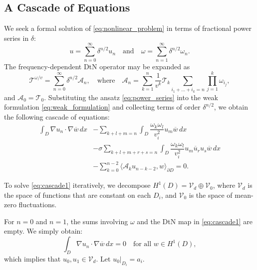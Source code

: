 \documentclass[a4paper,reqno,twoside]{amsart}
\numberwithin{equation}{section}
\theoremstyle{definition}
\newcommand{\<}{\ensuremath \leq}
\renewcommand{\>}{\ensuremath \geq}
\begin{document}
\subsection{A Cascade of Equations}\label{ssec:cascade}
We seek a formal solution of \eqref{eq:nonlinear_problem} in terms of fractional power series in $\delta$:
\begin{equation}\label{eq:power_series}
    u = \sum_{n=0}^\infty \delta^{n/2} u_n \quad \text{and} \quad \omega = \sum_{n=1}^\infty \delta^{n/2} \omega_n.
\end{equation}
The frequency-dependent DtN operator may be expanded as
\begin{equation}
    \mathcal{T}^{\omega/v} = \sum_{n=0}^\infty \delta^{n/2} \mathcal{A}_n, \quad \text{where} \quad \mathcal{A}_n = \sum_{k=1}^n \frac{1}{v^k}\mathcal{T}_k \sum _{i_1 + \dots+i_k=n}\prod_{j=1}^k\omega_{i_j},
\end{equation}
and $\mathcal{A}_0 = \mathcal{T}_0$. Substituting the ansatz \eqref{eq:power_series} into the weak formulation \eqref{eq:weak_formulation} and collecting terms of order $\delta^{n/2}$, we obtain the following cascade of equations:
\begin{equation}\label{eq:cascade1}
    \begin{aligned}
        \int_{D} \nabla u_n \cdot \nabla \overline{w} \, dx 
        &- \sum_{k+l+m=n}\int_D \dfrac{\omega_k\omega_l}{v_i^2} u_m \overline{w} \, dx \\
        &- \sigma \sum_{k+l+m+r+s=n}\int_D \dfrac{\omega_k\omega_l}{v_i^2}u_m\overline{u}_r u_s\overline{w} \, dx \\
        &- \sum_{k=0}^{n-2}\langle\mathcal{A}_k u_{n-k-2},w\rangle_{\partial D} = 0.
    \end{aligned}
\end{equation}

To solve \eqref{eq:cascade1} iteratively, we decompose $H^1(D) = \mathcal{V}_{d} \oplus \mathcal{V}_0$, where $\mathcal{V}_{d}$ is the space of functions that are constant on each $D_i$, and $\mathcal{V}_0$ is the space of mean-zero fluctuations.

For $n = 0$ and $n = 1$, the sums involving $\omega$ and the DtN map in \eqref{eq:cascade1} are empty. We simply obtain:
\begin{equation}
    \int_{D} \nabla u_n\cdot \nabla \overline{w} \, dx = 0 \quad \text{for all } w \in H^1(D),
\end{equation}
which implies that $u_0, u_1 \in \mathcal{V}_{d}$. Let $u_0|_{D_i} = a_i$. 
\end{document}
